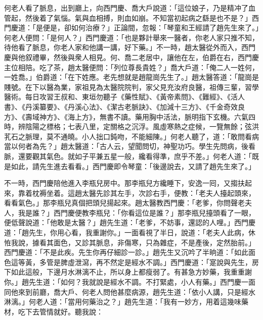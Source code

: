 何老人看了脈息，出到廳上，向西門慶、喬大戶說道：「這位娘子，乃是精冲了血管起，{}然後着了氣惱。氣與血相搏，則血如崩。{}不知當初起病之繇是也不是？」西門慶道：「是便是，卻如何治療？」正論間，忽報：「琴童和王經請了趙先生來了。」何老人便問：「是何人？」西門慶道：「也是夥計舉來一醫者，你老人家只推不知，待他看了脈息，你老人家和他講一講，好下藥。」不一時，趙太醫從外而入，西門慶與他叙禮畢，然後與衆人相見。何、喬二老居中，讓他在左，伯爵在右，西門慶主位相陪。吃了茶，趙太醫便問：「列位尊長貴姓？」喬大戶道：「俺二人一姓何，一姓喬。」伯爵道：「在下姓應。老先想就是趙龍崗先生了。」趙太醫答道：「龍崗是賤號。{}在下以醫為業，家祖見為太醫院院判，家父見充汝府良醫，祖傳三輩，習學醫術。{}每日攻習王叔和、東垣勿聽子《藥性賦》、《黃帝素問》、《難經》、《活人書》、《丹溪纂要》、《丹溪心法》、《潔古老脈訣》、《加減十三方》、《千金奇效良方》、《壽域神方》、《海上方》，無書不讀。藥用胸中活法，脈明指下玄機。六氣四時，辨陰陽之標格；七表八里，定關格之沉浮。{}風虛寒熱之症候，一覽無餘；弦洪芤石之脈理，莫不通曉。小人拙口鈍吻，不能細陳。」何老人聽了，道：「敢問看病當以何者為先？」趙太醫道：「古人云，望聞問切，神聖功巧。學生先問病，後看脈，還要觀其氣色。就如子平兼五星一般，{}纔看得準，庶乎不差。」何老人道：「既是如此，請先生進去看看。」西門慶即令琴童：「後邊說去，又請了趙先生來了。」

不一時，西門慶陪他進入李瓶兒房中。那李瓶兒方纔睡下，安逸一囘，{}又搊扶起來，靠着枕褥坐着。這趙太醫先診其左手，次診右手，便教：「老夫人擡起頭來，看看氣色。」那李瓶兒真個把頭兒揚起來。趙太醫教西門慶：「老爹，你問聲老夫人，我是誰？」{}西門慶便教李瓶兒：「你看這位是誰？」那李瓶兒擡頭看了一眼，便低聲說道：「他敢是太醫？」趙先生道：「老爹，不妨事，還認的人哩。」{}西門慶道：「趙先生，你用心看，我重謝你。」一面看視了半日，說道：「老夫人此病，休恠我說，據看其面色，又診其脈息，非傷寒，只為雜症，不是產後，定然胎前。」西門慶道：「不是此疾。先生你再仔細診一診。」趙先生又沉吟了半晌道：「如此面色這等黃，多管是脾虛泄瀉，再不然定是經水不調。」西門慶道：「寔說與先生，房下如此這般，下邊月水淋漓不止，所以身上都瘦弱了。有甚急方妙藥，我重重謝你。」趙先生道：「如何？我就說是經水不調。不打緊處，小人有藥。」{}西門慶一面同他來到前廳，喬大戶、何老人問他甚麼病源，趙先生道：「依小人講，只是經水淋漓。」何老人道：「當用何藥治之？」趙先生道：「我有一妙方，用着這幾味藥材，吃下去管情就好。聽我說：

